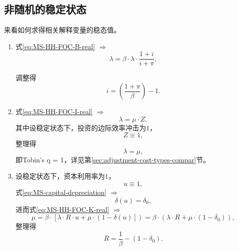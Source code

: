 \subsection{非随机的稳定状态}
来看如何求得相关解释变量的稳态值。

\begin{enumerate}

\item 式\eqref{eq:MS-HH-FOC-B-real} $\Rightarrow$
\begin{equation*}
\lambda = \beta \cdot \lambda \cdot \frac{1+i}{i+\pi},
\end{equation*}

调整得
\begin{equation}
\label{eq:MS-SS-HH-FOC-wrt-Bond}
i = \left(\frac{1+\pi}{\beta}\right) - 1.
\end{equation}

\item 式\eqref{eq:MS-HH-FOC-I-real} $\Rightarrow$
\begin{equation*}
\lambda = \mu \cdot Z,
\end{equation*}
其中设稳定状态下，投资的边际效率冲击为$1$，
\begin{equation}
\label{eq:MS-SS-Z-equal-1}
Z \equiv 1,
\end{equation}
整理得
\begin{equation}
\label{eq:MS-SS-shadow-price-equiv}
\lambda = \mu,
\end{equation}
即Tobin's q = 1，详见第\ref{sec:adjustment-cost-types-compar}节。

\item 设稳定状态下，资本利用率为$1$，
\begin{equation}
\label{eq:MS-SS-cap-util-equiv-1}
u \equiv 1,
\end{equation}
式\eqref{eq:MS-capital-depreciation} $\Rightarrow$
\begin{equation}
\label{eq:MS-SS-depreciation-capital-tulization}
\delta(u) = \delta_0,
\end{equation}
进而式\eqref{eq:MS-HH-FOC-K-real} $\Rightarrow$
\begin{equation*}
\mu = \beta \cdot \left[
\lambda \cdot R \cdot u + \mu \cdot \left( 1 - \delta(u) \right]
\right) = \beta \cdot
\left(
  \lambda \cdot R + \mu \cdot \left( 1 - \delta_0 \right)
\right),
\end{equation*}
整理得
\begin{equation}
\label{MS-SS-interest-rate}
R = \frac{1}{\beta} - \left( 1 - \delta_0 \right).
\end{equation}


\end{enumerate}
